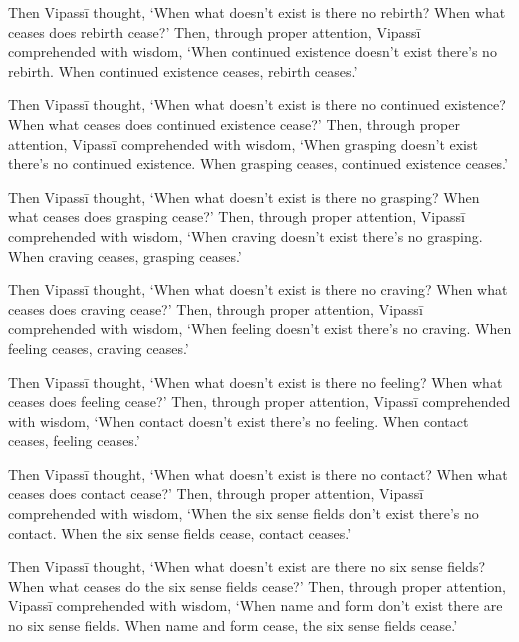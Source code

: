 \documentclass[12pt,openany]{book}%
\begin{document}
Then \textsanskrit{Vipassī} thought, ‘When what doesn’t exist is there no rebirth? When what ceases does rebirth cease?’ Then, through proper attention, \textsanskrit{Vipassī} comprehended with wisdom, ‘When continued existence doesn’t exist there’s no rebirth. When continued existence ceases, rebirth ceases.’ 

Then \textsanskrit{Vipassī} thought, ‘When what doesn’t exist is there no continued existence? When what ceases does continued existence cease?’ Then, through proper attention, \textsanskrit{Vipassī} comprehended with wisdom, ‘When grasping doesn’t exist there’s no continued existence. When grasping ceases, continued existence ceases.’ 

Then \textsanskrit{Vipassī} thought, ‘When what doesn’t exist is there no grasping? When what ceases does grasping cease?’ Then, through proper attention, \textsanskrit{Vipassī} comprehended with wisdom, ‘When craving doesn’t exist there’s no grasping. When craving ceases, grasping ceases.’ 

Then \textsanskrit{Vipassī} thought, ‘When what doesn’t exist is there no craving? When what ceases does craving cease?’ Then, through proper attention, \textsanskrit{Vipassī} comprehended with wisdom, ‘When feeling doesn’t exist there’s no craving. When feeling ceases, craving ceases.’ 

Then \textsanskrit{Vipassī} thought, ‘When what doesn’t exist is there no feeling? When what ceases does feeling cease?’ Then, through proper attention, \textsanskrit{Vipassī} comprehended with wisdom, ‘When contact doesn’t exist there’s no feeling. When contact ceases, feeling ceases.’ 

Then \textsanskrit{Vipassī} thought, ‘When what doesn’t exist is there no contact? When what ceases does contact cease?’ Then, through proper attention, \textsanskrit{Vipassī} comprehended with wisdom, ‘When the six sense fields don’t exist there’s no contact. When the six sense fields cease, contact ceases.’ 

Then \textsanskrit{Vipassī} thought, ‘When what doesn’t exist are there no six sense fields? When what ceases do the six sense fields cease?’ Then, through proper attention, \textsanskrit{Vipassī} comprehended with wisdom, ‘When name and form don’t exist there are no six sense fields. When name and form cease, the six sense fields cease.’ 
\end{document}
